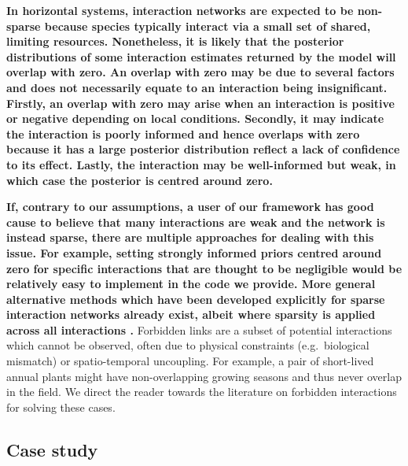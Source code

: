\documentclass[a4,12pt]{article}
\begin{document}
\begin{refsection}
    \textbf{In horizontal systems, interaction networks are expected to be non-sparse because species typically interact via a small set of shared, limiting resources. Nonetheless, it is likely that the posterior distributions of some interaction estimates returned by the model will overlap with zero. An overlap with zero may be due to several factors and does not necessarily equate to an interaction being insignificant. Firstly, an overlap with zero may arise when an interaction is positive or negative depending on local conditions. Secondly, it may indicate the interaction is poorly informed and hence overlaps with zero because it has a large posterior distribution reflect a lack of confidence to its effect. Lastly, the interaction may be well-informed but weak, in which case the posterior is centred around zero.}

    \textbf{If, contrary to our assumptions, a user of our framework has good cause to believe that many interactions are weak and the network is instead sparse, there are multiple approaches for dealing with this issue. For example, setting strongly informed priors centred around zero for specific interactions that are thought to be negligible would be relatively easy to implement in the code we provide. More general alternative methods which have been developed explicitly for sparse interaction networks already exist, albeit where sparsity is applied across all interactions \parencite{Weiss-Lehman2022}.} Forbidden links are a subset of potential interactions which cannot be observed, often due to physical constraints (e.g.\ biological mismatch) or spatio-temporal uncoupling. For example, a pair of short-lived annual plants might have non-overlapping growing seasons and thus never overlap in the field. We direct the reader towards the literature on forbidden interactions \parencite{Olesen2011, Jordano2016} for solving these cases. 

    \subsection{Case study}


\end{refsection}
\end{document}
